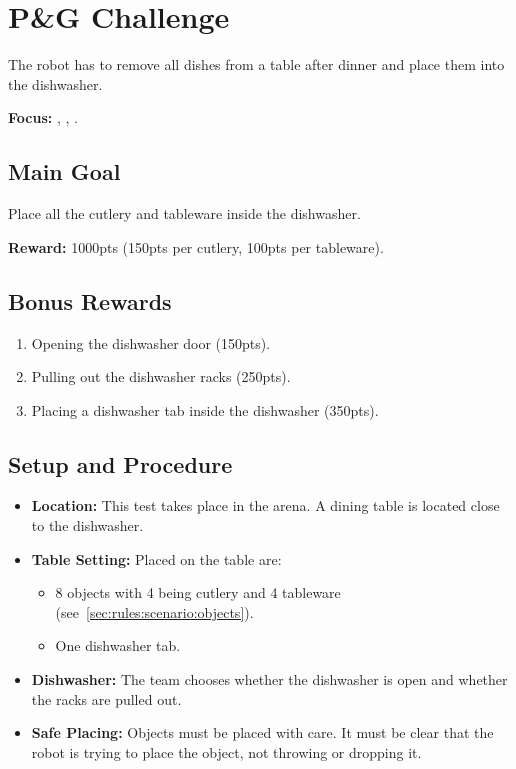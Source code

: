 \section{P\&G Challenge}
\label{test:clean-the-table}
The robot has to remove all dishes from a table after dinner and place them into the dishwasher.

\noindent \textbf{Focus:} \SysI, \MAN{} \CV{}, \OR{}.

\subsection*{Main Goal}
Place all the cutlery and tableware inside the dishwasher.

\noindent\textbf{Reward:} 1000pts (150pts per cutlery, 100pts per tableware).

\subsection*{Bonus Rewards}
\begin{enumerate}[nosep]
	\item Opening the dishwasher door (150pts).
	\item Pulling out the dishwasher racks (250pts).
	\item Placing a dishwasher tab inside the dishwasher (350pts).
\end{enumerate}

\subsection*{Setup and Procedure}
\begin{itemize}[nosep]
	\item \textbf{Location:} This test takes place in the arena. A dining table is located close to the dishwasher.
	
	\item \textbf{Table Setting:} Placed on the table are: 
	\begin{itemize}[nosep]
		\item 8 objects with 4 being cutlery and 4 tableware (see~\ref{sec:rules:scenario:objects}).
		\item One dishwasher tab.
	\end{itemize}
	
	\item \textbf{Dishwasher:} The team chooses whether the dishwasher is open and whether the racks are pulled out.
	
	\item \textbf{Safe Placing:} Objects must be placed with care. It must be clear that the robot is trying to place the object, not throwing or dropping it.
\end{itemize}


